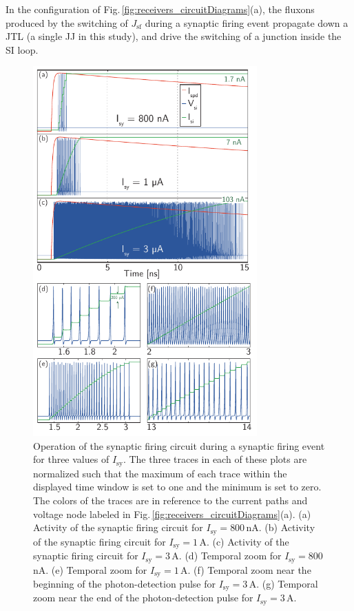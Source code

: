 \documentclass[aip,amsmath,amssymb,reprint,nofootinbib]{revtex4-1}
\begin{document}
In the configuration of Fig.\,\ref{fig:receivers_circuitDiagrams}(a), the fluxons produced by the switching of $J_{\mathrm{sf}}$ during a synaptic firing event propagate down a JTL (a single JJ in this study), and drive the switching of a junction inside the SI loop.
\begin{figure}[t!]
	\centerline{\includegraphics[width=8.6cm]{_receivers_sffg_firingDetail_small.pdf}}
	\caption{\label{fig:receivers_sffg_firingDetail} Operation of the synaptic firing circuit during a synaptic firing event for three values of $I_{\mathrm{sy}}$. The three traces in each of these plots are normalized such that the maximum of each trace within the displayed time window is set to one and the minimum is set to zero. The colors of the traces are in reference to the current paths and voltage node labeled in Fig.\,\ref{fig:receivers_circuitDiagrams}(a). (a) Activity of the synaptic firing circuit for $I_{\mathrm{sy}} = 800$\,nA. (b) Activity of the synaptic firing circuit for $I_{\mathrm{sy}} = 1$\,\textmu A. (c) Activity of the synaptic firing circuit for $I_{\mathrm{sy}} = 3$\,\textmu A. (d) Temporal zoom for $I_{\mathrm{sy}} = 800$\,nA. (e) Temporal zoom for $I_{\mathrm{sy}} = 1$\,\textmu A. (f) Temporal zoom near the beginning of the photon-detection pulse for $I_{\mathrm{sy}} = 3$\,\textmu A. (g) Temporal zoom near the end of the photon-detection pulse for $I_{\mathrm{sy}} = 3$\,\textmu A.} 
\end{figure}  
\end{document}
